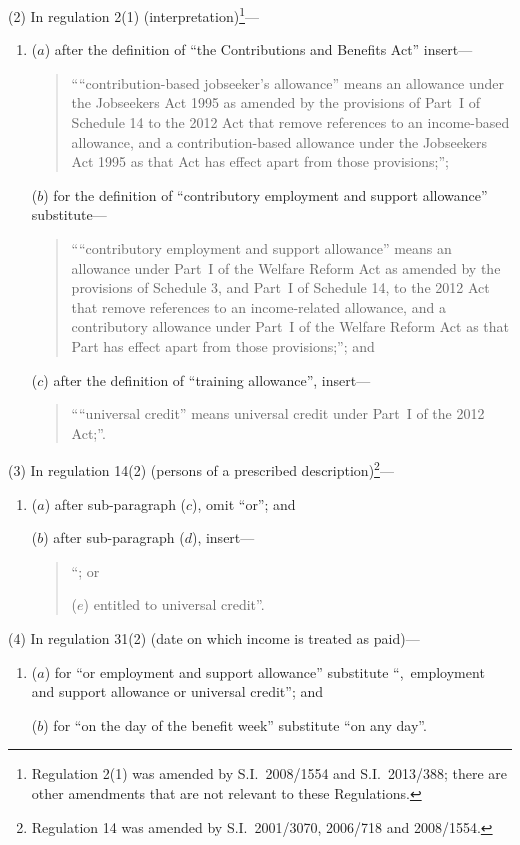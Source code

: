 \documentclass[12pt,a4paper]{article}
\begin{document}
(2) In regulation 2(1) (interpretation)\footnote{Regulation 2(1) was amended by S.I.~2008/1554 and S.I.~2013/388; there are other amendments that are not relevant to these Regulations.}—
\begin{enumerate}\item[]
($a$) after the definition of “the Contributions and Benefits Act” insert—
\begin{quotation}
““contribution-based jobseeker’s allowance” means an allowance under the Jobseekers Act 1995 as amended by the provisions of Part~I of Schedule 14 to the 2012 Act that remove references to an income-based allowance, and a contribution-based allowance under the Jobseekers Act 1995 as that Act has effect apart from those provisions;”;
\end{quotation}

($b$) for the definition of “contributory employment and support allowance” substitute—
\begin{quotation}
““contributory employment and support allowance” means an allowance under Part~I of the Welfare Reform Act as amended by the provisions of Schedule 3, and Part~I of Schedule 14, to the 2012 Act that remove references to an income-related allowance, and a contributory allowance under Part~I of the Welfare Reform Act as that Part has effect apart from those provisions;”; and
\end{quotation}

($c$) after the definition of “training allowance”, insert—
\begin{quotation}
““universal credit” means universal credit under Part~I of the 2012 Act;”.
\end{quotation}
\end{enumerate}

(3) In regulation 14(2) (persons of a prescribed description)\footnote{Regulation 14 was amended by S.I.~2001/3070, 2006/718 and 2008/1554.}—
\begin{enumerate}\item[]
($a$) after sub-paragraph ($c$), omit “or”; and

($b$) after sub-paragraph ($d$), insert—
\begin{quotation}
“; or

($e$) entitled to universal credit”.
\end{quotation}
\end{enumerate}

(4) In regulation 31(2) (date on which income is treated as paid)—
\begin{enumerate}\item[]
($a$) for “or employment and support allowance” substitute “,~employment and support allowance or universal credit”; and

($b$) for “on the day of the benefit week” substitute “on any day”.
\end{enumerate}
\end{document}
